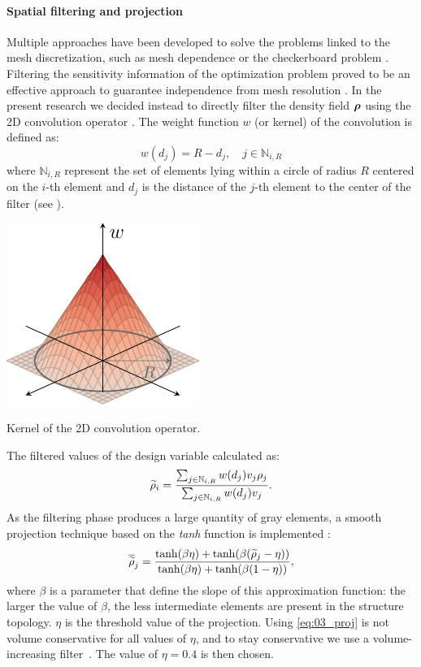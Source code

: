 \paragraph{Spatial filtering and projection}
Multiple approaches have been developed to solve the problems linked to the mesh discretization, such as mesh dependence or the checkerboard problem . Filtering the sensitivity information of the optimization problem proved to be an effective approach to guarantee independence from mesh resolution . In the present research we decided instead to directly filter the density field $\bm{\rho}$ using the 2D convolution operator . The weight function $w$ (or kernel) of the convolution is defined as:
\begin{equation}
    w(d_j) = R - d_j, \quad j \in \mathbb{N}_{i,R}
\end{equation} 
where $\mathbb{N}_{i,R}$ represent the set of elements lying within a circle of radius $R$ centered on the $i$-th element and $d_j$ is the distance of the $j$-th element to the center of the filter (see ).
\begin{marginfigure}
    \centering
    \includegraphics{figures/03_comparison_TO_TTO/01_circ_filter/filt_cir.pdf}
    \caption{Kernel of the 2D convolution operator.}
    \label{fig:03_ker}
\end{marginfigure} 
The filtered values of the design variable calculated as:
\begin{equation}
    \widetilde{\rho}_i = \frac{\sum_{j \in \mathbb{N}_{i,R}} w(d_j)v_j\rho_j}{\sum_{j \in \mathbb{N}_{i,R}} w(d_j)v_j}.
    \label{eq:03_rhofil}
\end{equation}
As the filtering phase produces a large quantity of gray elements, a smooth projection technique based on the \textit{tanh} function is implemented :
\begin{equation}
    \overline{\widetilde{\rho}}_j = \frac{\tanh(\beta\eta)+\tanh(\beta(\widetilde{\rho}_j - \eta))}{\tanh(\beta\eta)+\tanh(\beta(1 - \eta))},
    \label{eq:03_proj}
\end{equation}
where $\beta$ is a parameter that define the slope of this approximation function: the larger the value of $\beta$, the less intermediate elements are present in the structure topology. $\eta$ is the threshold value of the projection. Using \eqref{eq:03_proj} is not volume conservative for all values of $\eta$, and to stay conservative we use a volume-increasing filter~. The value of $\eta = 0.4$ is then chosen.

